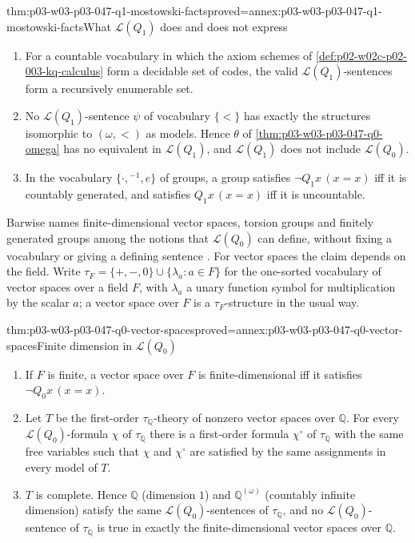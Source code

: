 \begin{hbtheorem}{thm:p03-w03-p03-047-q1-mostowski-facts}{proved=annex:p03-w03-p03-047-q1-mostowski-facts}{What \(\mathscr L(Q_1)\) does and does not express}
\begin{enumerate}
 \item For a countable vocabulary in which the axiom schemes of
       \cref{def:p02-w02c-p02-003-kq-calculus} form a decidable set of codes,
       the valid \(\mathscr L(Q_1)\)-sentences form a recursively enumerable
       set.
 \item No \(\mathscr L(Q_1)\)-sentence \(\psi\) of vocabulary \(\{<\}\) has
       exactly the structures isomorphic to \((\omega,<)\) as models.  Hence
       \(\theta\) of \cref{thm:p03-w03-p03-047-q0-omega} has no equivalent
       in \(\mathscr L(Q_1)\), and \(\mathscr L(Q_1)\) does not include
       \(\mathscr L(Q_0)\).
 \item In the vocabulary \(\{\cdot,{}^{-1},e\}\) of groups, a group
       satisfies \(\neg Q_1x\,(x=x)\) iff it is countably generated, and
       satisfies \(Q_1x\,(x=x)\) iff it is uncountable.
\end{enumerate}
\end{hbtheorem}

Barwise names finite-dimensional vector spaces, torsion groups and
finitely generated groups among the notions that \(\mathscr L(Q_0)\) can
define, without fixing a vocabulary or giving a defining sentence
\cite[Ch.~I, \S1.5, p.~8]{Barwise1985BackgroundAims}.  For vector spaces the
claim depends on the field.  Write \(\tau_F=\{+,-,0\}\cup\{\lambda_a:a\in F\}\)
for the one-sorted vocabulary of vector spaces over a field \(F\), with
\(\lambda_a\) a unary function symbol for multiplication by the scalar
\(a\); a vector space over \(F\) is a \(\tau_F\)-structure in the usual way.

\begin{hbtheorem}{thm:p03-w03-p03-047-q0-vector-spaces}{proved=annex:p03-w03-p03-047-q0-vector-spaces}{Finite dimension in \(\mathscr L(Q_0)\)}
\begin{enumerate}
 \item If \(F\) is finite, a vector space over \(F\) is finite-dimensional
       iff it satisfies \(\neg Q_0x\,(x=x)\).
 \item Let \(T\) be the first-order \(\tau_{\mathbb Q}\)-theory of nonzero
       vector spaces over \(\mathbb Q\).  For every
       \(\mathscr L(Q_0)\)-formula \(\chi\) of \(\tau_{\mathbb Q}\) there is
       a first-order formula \(\chi^\circ\) of \(\tau_{\mathbb Q}\) with the
       same free variables such that \(\chi\) and \(\chi^\circ\) are
       satisfied by the same assignments in every model of \(T\).
 \item \(T\) is complete.  Hence \(\mathbb Q\) (dimension \(1\)) and
       \(\mathbb Q^{(\omega)}\) (countably infinite dimension) satisfy the
       same \(\mathscr L(Q_0)\)-sentences of \(\tau_{\mathbb Q}\), and no
       \(\mathscr L(Q_0)\)-sentence of \(\tau_{\mathbb Q}\) is true in
       exactly the finite-dimensional vector spaces over \(\mathbb Q\).
\end{enumerate}
\end{hbtheorem}

